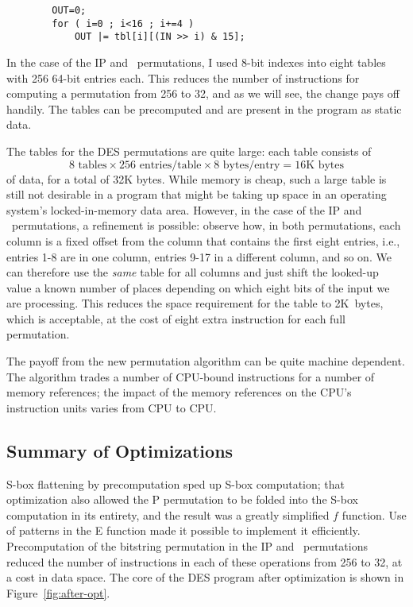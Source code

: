 \begin{verbatim}
        OUT=0;
        for ( i=0 ; i<16 ; i+=4 )
            OUT |= tbl[i][(IN >> i) & 15];
\end{verbatim}

In the case of the IP and \ipinv\ permutations, I used 8-bit indexes
into eight tables with 256 64-bit entries each.  This reduces the number of
instructions for computing a permutation from 256 to 32, and as we will
see, the change pays off handily.  The tables can be precomputed and
are present in the program as static data.

The tables for the DES permutations are quite large: each table
consists of \[8 \mbox{ tables} \times 256 \mbox{ entries}/\mbox{table}
\times 8 \mbox{ bytes}/\mbox{entry} = 16\mbox{K bytes}\] of data, for a
total of 32K bytes.  While memory is cheap, such a large table is
still not desirable in a program that might be taking up space in an
operating system's locked-in-memory data area.  However, in the case
of the IP and \ipinv\ permutations, a refinement is possible: observe
how, in both permutations, each column is a fixed offset from the
column that contains the first eight entries, i.e., entries 1-8 are in
one column, entries 9-17 in a different column, and so on.  We can
therefore use the {\em same} table for all columns and just shift the
looked-up value a known number of places depending on which eight bits
of the input we are processing.  This reduces the space requirement
for the table to 2K~bytes, which is acceptable, at the cost of eight
extra instruction for each full permutation.

The payoff from the new permutation algorithm can be quite machine
dependent.  The algorithm trades a number of CPU-bound instructions
for a number of memory references; the impact of the memory references
on the CPU's instruction units varies from CPU to CPU.

\subsection{Summary of Optimizations}

S-box flattening by precomputation sped up S-box computation; that
optimization also allowed the P permutation to be folded into the S-box
computation in its entirety, and the result was a greatly simplified $f$
function.  Use of patterns in the E function made it possible to
implement it efficiently.  Precomputation of the bitstring permutation
in the IP and \ipinv\ permutations reduced the number of instructions in
each of these operations from 256 to 32, at a cost in data space.  The
core of the DES program after optimization is shown in
Figure~\ref{fig:after-opt}.

